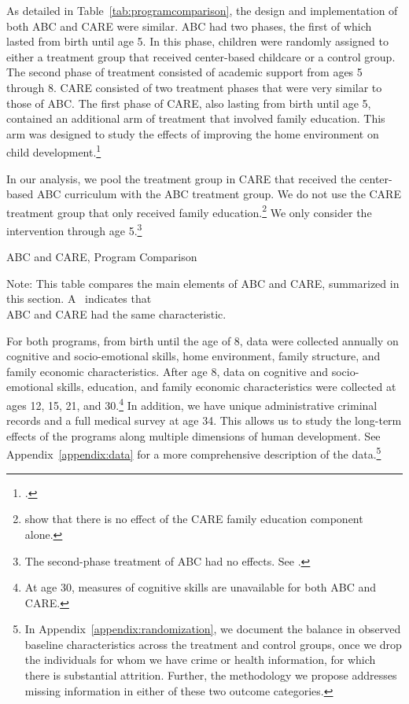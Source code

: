 As detailed in Table~\ref{tab:programcomparison}, the design and implementation of both ABC and CARE were similar. ABC had two phases, the first of which lasted from birth until age 5. In this phase, children were randomly assigned to either a treatment group that received center-based childcare or a control group. The second phase of treatment consisted of academic support from ages 5 through 8. CARE consisted of two treatment phases that were very similar to those of ABC. The first phase of CARE, also lasting from birth until age 5, contained an additional arm of treatment that involved family education. This arm was designed to study the effects of improving the home environment on child development.\footnote{\citet{Wasik_Ramey_etal_1990_CD}.}

In our analysis, we pool the treatment group in CARE that received the center-based ABC curriculum with the ABC treatment group. We do not use the CARE treatment group that only received family education.\footnote{\citet{ABCCARE_Dataset} show that there is no effect of the CARE family education component alone.} We only consider the intervention through age 5.\footnote{The second-phase treatment of ABC had no effects. See \citealp{Campbell_Conti_etal_2014_EarlyChildhoodInvestments}.}

\begin{table}[htbp]
\centering
\begin{threeparttable}
\caption{ABC and CARE, Program Comparison} \label{tab:programcomparison}
\footnotesize
\centerline{
	\scalebox{0.8}{
	
	}
}
\footnotesize
\begin{tablenotes}
\item Note: This table compares the main elements of ABC and CARE, summarized in this section. A \checkmark\ indicates that  \\ ABC and CARE had the same characteristic.
\end{tablenotes}
\end{threeparttable}%
\end{table}


For both programs, from birth until the age of 8, data were collected annually on cognitive and socio-emotional skills, home environment, family structure, and family economic characteristics. After age 8, data on cognitive and socio-emotional skills, education, and family economic characteristics were collected at ages 12, 15, 21, and 30.\footnote{At age 30, measures of cognitive skills are unavailable for both ABC and CARE.} In addition, we have unique administrative criminal records and a full medical survey at age 34. This allows us to study the long-term effects of the programs along multiple dimensions of human development. See Appendix~\ref{appendix:data} for a more comprehensive description of the data.\footnote{In Appendix~\ref{appendix:randomization}, we document the balance in observed baseline characteristics across the treatment and control groups, once we drop the individuals for whom we have crime or health information, for which there is substantial attrition. Further, the methodology we propose addresses missing information in either of these two outcome categories.}

